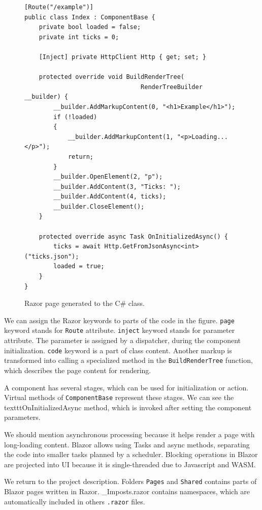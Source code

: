 \begin{figure}[t]
\begin{lstlisting}
[Route("/example")]
public class Index : ComponentBase {
    private bool loaded = false;
    private int ticks = 0;
	
    [Inject] private HttpClient Http { get; set; }

    protected override void BuildRenderTree(
    							RenderTreeBuilder __builder) {
        __builder.AddMarkupContent(0, "<h1>Example</h1>");
        if (!loaded)
        {
            __builder.AddMarkupContent(1, "<p>Loading...</p>");
            return;
        }
        __builder.OpenElement(2, "p");
        __builder.AddContent(3, "Ticks: ");
        __builder.AddContent(4, ticks);
        __builder.CloseElement();
    }

    protected override async Task OnInitializedAsync() {
        ticks = await Http.GetFromJsonAsync<int>("ticks.json");
        loaded = true;
    }
}
\end{lstlisting}
\caption{Razor page generated to the C\# class.}
\label{img06:component}
\end{figure}
\par
We can assign the Razor keywords to parts of the code in the figure.
\texttt{page} keyword stands for \texttt{Route} attribute.
\texttt{inject} keyword stands for parameter attribute. 
The parameter is assigned by a dispatcher, during the component initialization.
\texttt{code} keyword is a part of class content.
Another markup is transformed into calling a specialized method in the \texttt{BuildRenderTree} function, which describes the page content for rendering.
\par
A component has several stages, which can be used for initialization or action.
Virtual methods of \texttt{ComponentBase} represent these stages.
We can see the texttt{OnInitializedAsync} method, which is invoked after setting the component parameters.
\par
We should mention asynchronous processing because it helps render a page with long-loading content.
Blazor allows using Tasks and async methods, separating the code into smaller tasks planned by a scheduler.
Blocking operations in Blazor are projected into UI because it is single-threaded due to Javascript and WASM.
\par
We return to the project description. 
Folders \texttt{Pages} and \texttt{Shared} contains parts of Blazor pages written in Razor.
\_Imposts.razor contains namespaces, which are automatically included in others \texttt{.razor} files.
